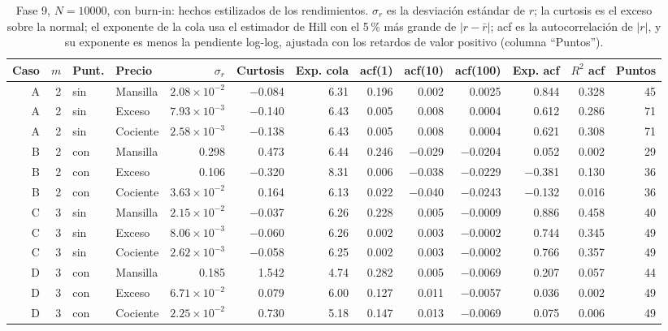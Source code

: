 \documentclass[11pt,letterpaper]{article}
\begin{document}
\begin{table}[H]
\centering
\footnotesize
\setlength{\tabcolsep}{3.5pt}
\caption{Fase 9, $N=10000$, con burn-in: hechos estilizados de los rendimientos. $\sigma_r$ es la desviación estándar de $r$; la curtosis es el exceso sobre la normal; el exponente de la cola usa el estimador de Hill con el 5\,\% más grande de $|r-\bar r|$; acf es la autocorrelación de $|r|$, y su exponente es menos la pendiente log-log, ajustada con los retardos de valor positivo (columna ``Puntos'').}\label{tab:f9hechos}
\begin{adjustbox}{max width=\textwidth}
\begin{tabular}{rrllrrrrrrrrr}
\toprule
Caso & $m$ & Punt. & Precio & $\sigma_r$ & Curtosis & Exp. cola & acf(1) & acf(10) & acf(100) & Exp. acf & $R^2$ acf & Puntos \\
\midrule
A & 2 & sin & Mansilla & $2.08\times10^{-2}$ & $-$0.084 & 6.31 & 0.196 & 0.002 & 0.0025 & 0.844 & 0.328 & 45 \\
A & 2 & sin & Exceso & $7.93\times10^{-3}$ & $-$0.140 & 6.43 & 0.005 & 0.008 & 0.0004 & 0.612 & 0.286 & 71 \\
A & 2 & sin & Cociente & $2.58\times10^{-3}$ & $-$0.138 & 6.43 & 0.005 & 0.008 & 0.0004 & 0.621 & 0.308 & 71 \\
B & 2 & con & Mansilla & 0.298 & 0.473 & 6.44 & 0.246 & $-$0.029 & $-$0.0204 & 0.052 & 0.002 & 29 \\
B & 2 & con & Exceso & 0.106 & $-$0.320 & 8.31 & 0.006 & $-$0.038 & $-$0.0229 & $-$0.381 & 0.130 & 36 \\
B & 2 & con & Cociente & $3.63\times10^{-2}$ & 0.164 & 6.13 & 0.022 & $-$0.040 & $-$0.0243 & $-$0.132 & 0.016 & 36 \\
C & 3 & sin & Mansilla & $2.15\times10^{-2}$ & $-$0.037 & 6.26 & 0.228 & 0.005 & $-$0.0009 & 0.886 & 0.458 & 40 \\
C & 3 & sin & Exceso & $8.06\times10^{-3}$ & $-$0.060 & 6.26 & 0.002 & 0.003 & $-$0.0002 & 0.744 & 0.345 & 49 \\
C & 3 & sin & Cociente & $2.62\times10^{-3}$ & $-$0.058 & 6.25 & 0.002 & 0.003 & $-$0.0002 & 0.766 & 0.357 & 49 \\
D & 3 & con & Mansilla & 0.185 & 1.542 & 4.74 & 0.282 & 0.005 & $-$0.0069 & 0.207 & 0.057 & 44 \\
D & 3 & con & Exceso & $6.71\times10^{-2}$ & 0.079 & 6.00 & 0.127 & 0.011 & $-$0.0057 & 0.036 & 0.002 & 49 \\
D & 3 & con & Cociente & $2.25\times10^{-2}$ & 0.730 & 5.18 & 0.147 & 0.013 & $-$0.0069 & 0.075 & 0.006 & 49 \\

\end{tabular}
\end{adjustbox}
\end{table}
\end{document}

